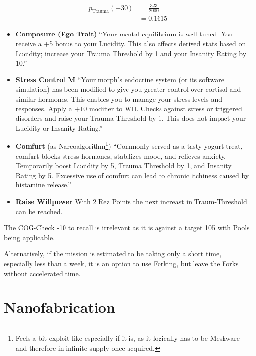 \begin{align}
    p_{\text{Trauma}}(-30) &= \frac{323}{2000} \\
    &= 0.1615
\end{align}

\begin{itemize}
    \item \textbf{\gls{Composure} (Ego Trait)} “Your mental equilibrium is well tuned. You receive a +5 bonus to your Lucidity. This also affects derived stats based on Lucidity; increase your Trauma Threshold by 1 and your Insanity Rating by 10.” \citep[pg. 73]{ep2e_1.1_2019}
    \item \textbf{Stress Control M} “Your morph’s endocrine system (or its software simulation) has been modified to give you greater control over cortisol and similar hormones. This enables you to manage your stress levels and responses. Apply a +10 modifier to WIL Checks against stress or triggered disorders and raise your Trauma Threshold by 1. This does not impact your Lucidity or Insanity Rating.” \citep[pg. 323]{ep2e_1.1_2019}
    \item \textbf{Comfurt} (as Narcoalgorithm\footnote{Feels a bit exploit-like especially if it is, as it logically has to be Meshware and therefore in infinite supply once acquired.}) “Commonly served as a tasty yogurt treat, comfurt blocks stress hormones, stabilizes mood, and relieves anxiety. Temporarily boost Lucidity by 5, Trauma Threshold by 1, and Insanity Rating by 5. Excessive use of comfurt can lead to chronic itchiness caused by histamine release.” \citep[pg. 332]{ep2e_1.1_2019}
    \item \textbf{Raise Willpower} With 2 Rez Points the next increast in Traum-Threshold can be reached.
\end{itemize}

The COG-Check -10 to recall is irrelevant as it is against a target 105 with Pools being applicable.

Alternatively, if the mission is estimated to be taking only a short time, especially less than a week, it is an option to use \gls{Forking}, but leave the \glspl{Fork} without accelerated time.

\section{Nanofabrication}

